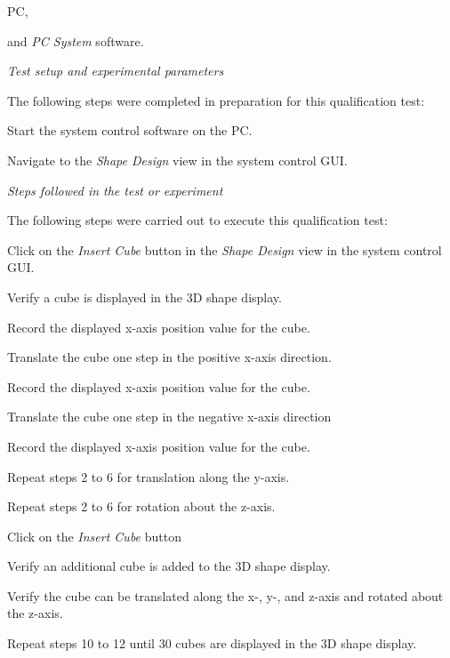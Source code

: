 \begin{compactitem}
	\item PC,
	\item and \textit{PC System} software.
\end{compactitem}

\textit{Test setup and experimental parameters}

The following steps were completed in preparation for this qualification test:
\begin{compactenum}
	\item Start the system control software on the PC.
	\item Navigate to the \textit{Shape Design} view in the system control GUI.
\end{compactenum}

\textit{Steps followed in the test or experiment}

The following steps were carried out to execute this qualification test:

\begin{compactenum}
	\item Click on the \textit{Insert Cube} button in the \textit{Shape Design} view in the system control GUI.
	\item Verify a cube is displayed in the 3D shape display.
	\item Record the displayed x-axis position value for the cube.
	\item Translate the cube one step in the positive x-axis direction.
	\item Record the displayed x-axis position value for the cube.
	\item Translate the cube one step in the negative x-axis direction
	\item Record the displayed x-axis position value for the cube.
	\item Repeat steps 2 to 6 for translation along the y-axis.
	\item Repeat steps 2 to 6 for rotation about the z-axis.
	\item Click on the \textit{Insert Cube} button
	\item Verify an additional cube is added to the 3D shape display.
	\item Verify the cube can be translated along the x-, y-, and z-axis and rotated about the z-axis.
	\item Repeat steps 10 to 12 until 30 cubes are displayed in the 3D shape display.
\end{compactenum}

